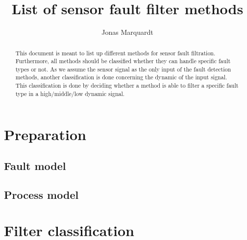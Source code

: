 \documentclass[a4paper,11pt]{article}
\title{List of sensor fault filter methods}
\author{Jonas Marquardt}
\begin{document}
\maketitle
\tableofcontents

\begin{abstract}
 This document is meant to list up different methods for sensor fault filtration. Furthermore, all methods should be classified whether they can handle specific fault types or not. As we assume the sensor signal as the only input of the fault detection methods, another classification is done concerning the dynamic of the input signal. This classification is done by deciding whether a method is able to filter a specific fault type in a high/middle/low dynamic signal. 
\end{abstract}

\section{Preparation}
 
	\subsection{Fault model}  


	\subsection{Process model}

\section{Filter classification}
\end{document}
